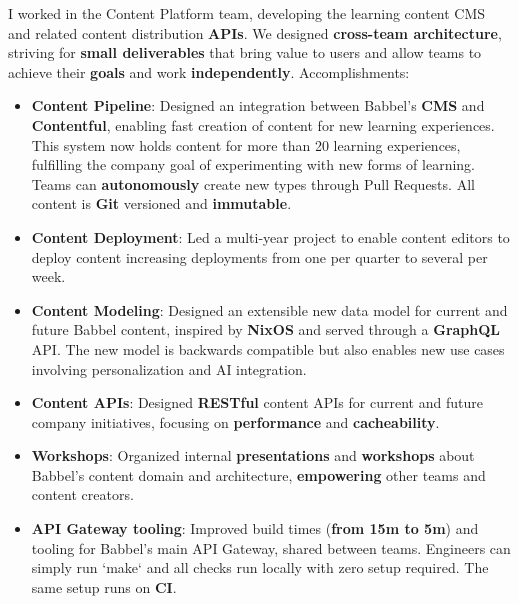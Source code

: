\documentclass[10pt,a4paper,ragged2e,withhyper]{altacv}
\newcommand{\accentbold}[1]{\textbf{\textcolor{accent}{#1}}}
\begin{document}
\begin{paracol}{2}



{\RaggedRight
I worked in the Content Platform team, developing the learning content CMS and related content distribution \accentbold{APIs}. We designed \accentbold{cross-team architecture}, striving for \accentbold{small deliverables} that bring value to users and allow teams to achieve their \accentbold{goals} and work \accentbold{independently}. Accomplishments:

\begin{itemize}
\item \accentbold{Content Pipeline}: Designed an integration between Babbel's \accentbold{CMS} and \accentbold{Contentful}, enabling fast creation of content for new learning experiences. This system now holds content for more than 20 learning experiences, fulfilling the company goal of experimenting with new forms of learning. Teams can \accentbold{autonomously} create new types through Pull Requests. All content is \accentbold{Git} versioned and \accentbold{immutable}.
\item \accentbold{Content Deployment}: Led a multi-year project to enable content editors to deploy content increasing deployments from one per quarter to several per week.
\item \accentbold{Content Modeling}: Designed an extensible new data model for current and future Babbel content, inspired by \accentbold{NixOS} and served through a \accentbold{GraphQL} API. The new model is backwards compatible but also enables new use cases involving personalization and AI integration.
\item \accentbold{Content APIs}: Designed \accentbold{RESTful} content APIs for current and future company initiatives, focusing on \accentbold{performance} and \accentbold{cacheability}.
\item \accentbold{Workshops}: Organized internal \accentbold{presentations} and \accentbold{workshops} about Babbel's content domain and architecture, \accentbold{empowering} other teams and content creators.
\item \accentbold{API Gateway tooling}: Improved build times (\accentbold{from 15m to 5m}) and tooling for Babbel's main API Gateway, shared between teams. Engineers can simply run `make` and all checks run locally with zero setup required. The same setup runs on \accentbold{CI}.

\end{itemize}}
\end{paracol}
\end{document}
